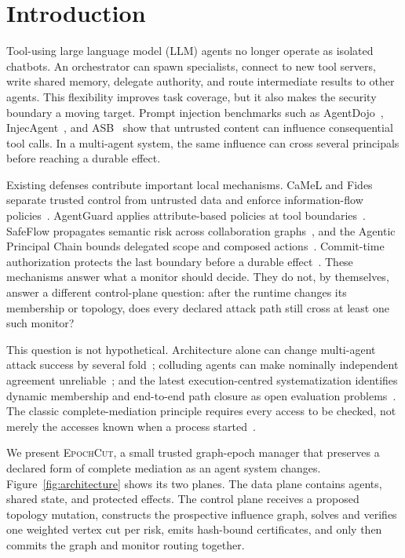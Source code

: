 \documentclass[10pt,journal,compsoc]{IEEEtran}
\newcommand{\system}{\textsc{EpochCut}}
\begin{document}
\section{Introduction}

Tool-using large language model (LLM) agents no longer operate as isolated
chatbots.  An orchestrator can spawn specialists, connect to new tool servers,
write shared memory, delegate authority, and route intermediate results to
other agents.  This flexibility improves task coverage, but it also makes the
security boundary a moving target.  Prompt injection benchmarks such as
AgentDojo~\cite{debenedetti2024agentdojo}, InjecAgent~\cite{zhan2024injecagent},
and ASB~\cite{zhang2025asb} show that untrusted content can influence
consequential tool calls.  In a multi-agent system, the same influence can
cross several principals before reaching a durable effect.

Existing defenses contribute important local mechanisms.  CaMeL and Fides
separate trusted control from untrusted data and enforce information-flow
policies~\cite{debenedetti2025camel,costa2025ifc}.  AgentGuard applies
attribute-based policies at tool boundaries~\cite{luo2026agentguard}.  SafeFlow
propagates semantic risk across collaboration graphs~\cite{dai2026safeflow},
and the Agentic Principal Chain bounds delegated scope and composed
actions~\cite{muruaga2026bounded}.  Commit-time authorization protects the last
boundary before a durable effect~\cite{santos2026commit}.  These mechanisms
answer what a monitor should decide.  They do not, by themselves, answer a
different control-plane question: after the runtime changes its membership or
topology, does every declared attack path still cross at least one such
monitor?

This question is not hypothetical.  Architecture alone can change multi-agent
attack success by several fold~\cite{hagag2026architecture}; colluding agents
can make nominally independent agreement unreliable~\cite{motwani2024collusion};
and the latest execution-centred systematization identifies dynamic membership
and end-to-end path closure as open evaluation problems~\cite{yang2026sok}.
The classic complete-mediation principle requires every access to be checked,
not merely the accesses known when a process started~\cite{saltzer1975protection}.

We present \system, a small trusted graph-epoch manager that preserves a
declared form of complete mediation as an agent system changes.  Figure~\ref{fig:architecture}
shows its two planes.  The data plane contains agents, shared state, and
protected effects.  The control plane receives a proposed topology mutation,
constructs the prospective influence graph, solves and verifies one weighted
vertex cut per risk, emits hash-bound certificates, and only then commits the
graph and monitor routing together.
\end{document}
